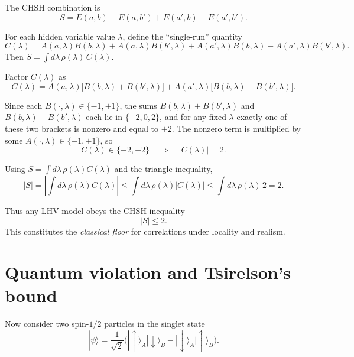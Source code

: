 \documentclass[11pt]{article}
\begin{document}
The CHSH combination is
\begin{equation}
S = E(a,b) + E(a,b') + E(a',b) - E(a',b').
\end{equation}

For each hidden variable value $\lambda$, define the ``single-run'' quantity
\begin{equation}
C(\lambda) = A(a,\lambda)B(b,\lambda)
+ A(a,\lambda)B(b',\lambda)
+ A(a',\lambda)B(b,\lambda)
- A(a',\lambda)B(b',\lambda).
\end{equation}
Then $S = \int d\lambda\,\rho(\lambda)\,C(\lambda)$.

Factor $C(\lambda)$ as
\begin{equation}
C(\lambda) = A(a,\lambda)\big[B(b,\lambda)+B(b',\lambda)\big]
+ A(a',\lambda)\big[B(b,\lambda)-B(b',\lambda)\big].
\end{equation}

Since each $B(\cdot,\lambda) \in \{-1,+1\}$, the sums $B(b,\lambda)+B(b',\lambda)$ and $B(b,\lambda)-B(b',\lambda)$ each lie in $\{-2,0,2\}$, and for any fixed $\lambda$ exactly one of these two brackets is nonzero and equal to $\pm 2$. The nonzero term is multiplied by some $A(\cdot,\lambda)\in\{-1,+1\}$, so
\begin{equation}
C(\lambda) \in \{-2,+2\} \quad \Rightarrow \quad |C(\lambda)| = 2.
\end{equation}

Using $S = \int d\lambda\,\rho(\lambda)C(\lambda)$ and the triangle inequality,
\begin{equation}
|S| = \left|\int d\lambda\,\rho(\lambda)C(\lambda)\right|
\le \int d\lambda\,\rho(\lambda)|C(\lambda)|
\le \int d\lambda\,\rho(\lambda)\,2 = 2.
\end{equation}

Thus any LHV model obeys the CHSH inequality
\begin{equation}
|S| \le 2.
\end{equation}
This constitutes the \emph{classical floor} for correlations under locality and realism.

\section{Quantum violation and Tsirelson's bound}

Now consider two spin-$1/2$ particles in the singlet state
\begin{equation}
|\psi\rangle = \frac{1}{\sqrt{2}}\Big(|\uparrow\rangle_A|\downarrow\rangle_B - |\downarrow\rangle_A|\uparrow\rangle_B\Big).
\end{equation}
\end{document}
